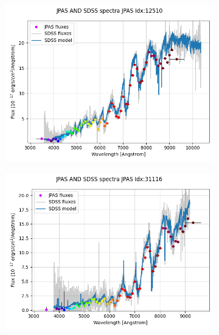 \documentclass{beamer}
\begin{document}
\begin{frame}
    \begin{figure}
        \begin{subfigure}{.3\linewidth}
            \centering
            \includegraphics[width=1.0\textwidth]{../../figs/spec/jpas_sdss_12510.png}
        \end{subfigure}
        \begin{subfigure}{0.3\linewidth}
            \centering
            \includegraphics[width=1.0\textwidth]{../../figs/spec/jpas_sdss_31116.png}
        \end{subfigure}
        \begin{subfigure}{0.3\linewidth}
            \centering

\end{subfigure}
\end{figure}
\end{frame}
\end{document}
